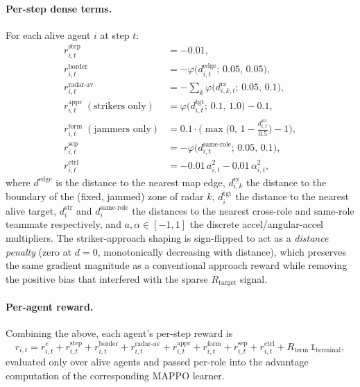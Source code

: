 \documentclass[11pt,a4paper]{article}
\begin{document}
\paragraph{Per-step dense terms.}
For each alive agent $i$ at step $t$:
\begin{align}
r^{\text{step}}_{i,t} &= -0.01, \\
r^{\text{border}}_{i,t} &= -\varphi\big(d^{\text{edge}}_{i,t};\,0.05,\,0.05\big), \\
r^{\text{radar-av}}_{i,t} &= -\sum_k \varphi\big(d^{\text{rz}}_{i,k,t};\,0.05,\,0.1\big), \\
r^{\text{appr}}_{i,t} \;(\text{strikers only})
   &= \varphi\big(d^{\text{tgt}}_{i,t};\,0.1,\,1.0\big)-0.1, \\
r^{\text{form}}_{i,t} \;(\text{jammers only})
   &= 0.1\!\cdot\!\Big(\max\!\big(0,\,1-\tfrac{d^{\text{str}}_{i,t}}{0.5}\big)-1\Big), \\
r^{\text{sep}}_{i,t}  &= -\varphi\big(d^{\text{same-role}}_{i,t};\,0.05,\,0.1\big), \\
r^{\text{ctrl}}_{i,t} &= -0.01\,a_{i,t}^{2} - 0.01\,\alpha_{i,t}^{2},
\end{align}
where $d^{\text{edge}}$ is the distance to the nearest map edge,
$d^{\text{rz}}_{i,k}$ the distance to the boundary of the (fixed, jammed) zone
of radar $k$, $d^{\text{tgt}}_{i}$ the distance to the nearest alive target,
$d^{\text{str}}_{i}$ and $d^{\text{same-role}}_{i}$ the distances to the
nearest cross-role and same-role teammate respectively, and
$a,\alpha\in[-1,1]$ the discrete accel/angular-accel multipliers.
The striker-approach shaping is sign-flipped to act as a \emph{distance
penalty} (zero at $d{=}0$, monotonically decreasing with distance), which
preserves the same gradient magnitude as a conventional approach reward
while removing the positive bias that interfered with the sparse
$R_{\text{target}}$ signal.

\paragraph{Per-agent reward.}
Combining the above, each agent's per-step reward is
\begin{equation}
r_{i,t} = r^{e}_{i,t} + r^{\text{step}}_{i,t}
+ r^{\text{border}}_{i,t} + r^{\text{radar-av}}_{i,t}
+ r^{\text{appr}}_{i,t} + r^{\text{form}}_{i,t}
+ r^{\text{sep}}_{i,t} + r^{\text{ctrl}}_{i,t}
+ R_{\text{term}}\,\mathbb{1}_{\text{terminal}},
\end{equation}
evaluated only over alive agents and passed per-role into the advantage
computation of the corresponding MAPPO learner.
\end{document}
